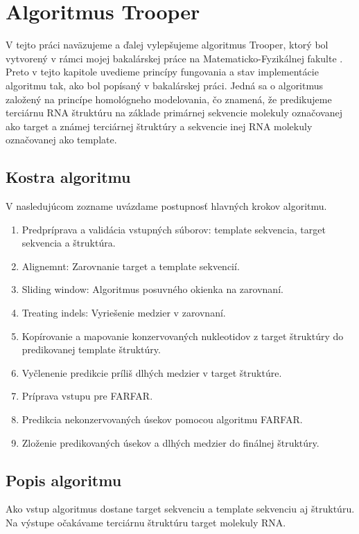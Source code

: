 \chapter{Algoritmus Trooper}

V tejto práci naväzujeme a ďalej vylepšujeme algoritmus Trooper, ktorý bol vytvorený v rámci mojej  bakalárskej práce na Matematicko-Fyzikálnej fakulte \cite{bc}. Preto v tejto kapitole uvedieme princípy fungovania a stav implementácie algoritmu tak, ako bol popísaný v bakalárskej práci.
Jedná sa o algoritmus založený na princípe homológneho modelovania, čo znamená, že predikujeme terciárnu RNA štruktúru na základe primárnej sekvencie molekuly označovanej ako target a známej terciárnej štruktúry a sekvencie inej RNA molekuly označovanej ako template.


\section{Kostra algoritmu}

V nasledujúcom zozname uvázdame postupnosť hlavných krokov algoritmu.\label{3-kostra}
\begin{enumerate}
\item Predpríprava a validácia vstupných súborov: template sekvencia, target sekvencia a štruktúra.
\item Alignemnt: Zarovnanie target a template sekvencií.
\item Sliding window: Algoritmus posuvného okienka na zarovnaní.
\item Treating indels: Vyriešenie medzier v zarovnaní. \label{3-indels}
\item Kopírovanie a mapovanie konzervovaných nukleotidov z target štruktúry do predikovanej template štruktúry. \label{3-map}
\item Vyčlenenie predikcie príliš dlhých medzier v target štruktúre.\label{3-sphere}
\item Príprava vstupu pre FARFAR.
\item Predikcia nekonzervovaných úsekov pomocou algoritmu FARFAR.
\item Zloženie predikovaných úsekov a dlhých medzier do finálnej štruktúry.
\end{enumerate}

\section{Popis algoritmu}
Ako vstup algoritmus dostane target sekvenciu a template sekvenciu aj štruktúru. Na výstupe očakávame terciárnu štruktúru target molekuly RNA.


